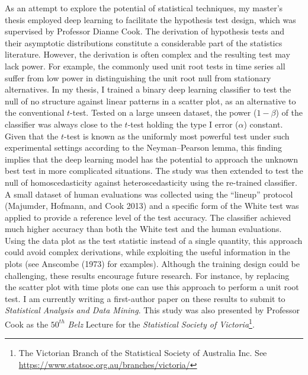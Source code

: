 \documentclass[12pt,]{article}
\let\rmarkdownfootnote\footnote%
\def\footnote{\protect\rmarkdownfootnote}
\begin{document}
As an attempt to explore the potential of statistical techniques, my
master's thesis employed deep learning to facilitate the hypothesis test
design, which was supervised by Professor Dianne Cook. The derivation of
hypothesis tests and their asymptotic distributions constitute a
considerable part of the statistics literature. However, the derivation
is often complex and the resulting test may lack power. For example, the
commonly used unit root tests in time series all suffer from low power
in distinguishing the unit root null from stationary alternatives. In my
thesis, I trained a binary deep learning classifier to test the null of
no structure against linear patterns in a scatter plot, as an
alternative to the conventional \(t\)-test. Tested on a large unseen
dataset, the power (\(1-\beta\)) of the classifier was always close to
the \(t\)-test holding the type I error (\(\alpha\)) constant. Given
that the \(t\)-test is known as the uniformly most powerful test under
such experimental settings according to the Neyman--Pearson lemma, this
finding implies that the deep learning model has the potential to
approach the unknown best test in more complicated situations. The study
was then extended to test the null of homoscedasticity against
heteroscedasticity using the re-trained classifier. A small dataset of
human evaluations was collected using the ``lineup'' protocol (Majumder,
Hofmann, and Cook 2013) and a specific form of the White test was
applied to provide a reference level of the test accuracy. The
classifier achieved much higher accuracy than both the White test and
the human evaluations. Using the data plot as the test statistic instead
of a single quantity, this approach could avoid complex derivations,
while exploiting the useful information in the plots (see Anscombe
(1973) for examples). Although the training design could be challenging,
these results encourage future research. For instance, by replacing the
scatter plot with time plots one can use this approach to perform a unit
root test. I am currently writing a first-author paper on these results
to submit to \emph{Statistical Analysis and Data Mining}. This study was
also presented by Professor Cook as the \(50^{th}\) \emph{Belz} Lecture
for the \emph{Statistical Society of Victoria}\footnote{The Victorian
  Branch of the Statistical Society of Australia Inc. See
  \url{https://www.statsoc.org.au/branches/victoria/}}.
\end{document}
